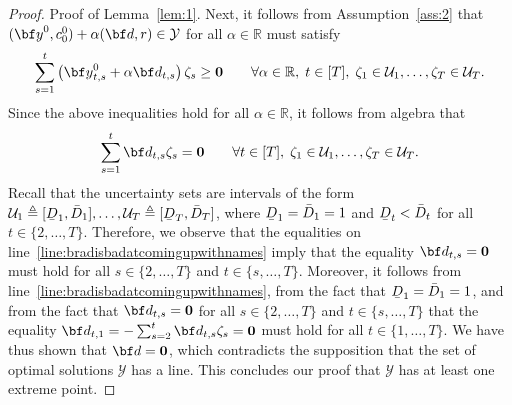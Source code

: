 \documentclass[nonblindrev,mnsc]{informs3} %
\newcommand{\bd}{{\bf d}}
\newcommand{\by}{{\bf y}}
\def\Real{\mathbb{R}}
\let\R\Real
\newcommand{\bzero}{{\boldsymbol{0}}}
\newcommand{\ubar}[1]{\text{\b{$#1$}}}
\begin{document}
\begin{APPENDICES}
\begin{proof}{Proof of Lemma~\ref{lem:1}.}
Next, it follows from Assumption~\ref{ass:2} that $(\by^0,c_0^0)+\alpha (\bd,r) \in \mathcal{Y}$ for all $\alpha\in\R$ must satisfy
\begin{align*}
    \sum_{s=1}^t \left( \by^0_{t,s} + \alpha \bd_{t,s}\right) \zeta_s \ge \bzero  \quad \quad \forall \alpha \in \R, \; t \in [T], \; \zeta_1 \in \mathcal{U}_1,\ldots,\zeta_T \in \mathcal{U}_T. 
\end{align*}
Since the above inequalities hold for all $\alpha \in \R$, it follows from algebra that
\begin{align}
        \sum_{s=1}^t  \bd_{t,s} \zeta_s = \bzero  \quad \quad \forall t \in [T], \; \zeta_1 \in \mathcal{U}_1,\ldots,\zeta_T \in \mathcal{U}_T.  \label{line:bradisbadatcomingupwithnames}
\end{align}
Recall that the uncertainty sets are intervals of the form $\mathcal{U}_1 \triangleq [\ubar{D}_1,\bar{D}_1],\ldots,\mathcal{U}_{T} \triangleq [\ubar{D}_{T}, \bar{D}_{T}]$, where $\ubar{D}_1 = \bar{D}_1 = 1$ and $\ubar{D}_t < \bar{D}_t$ for all $t \in \{2,\ldots,T\}$. Therefore, we observe  that the equalities on line~\eqref{line:bradisbadatcomingupwithnames} imply that the equality $\bd_{t,s} = \bzero$ must hold for all $s \in \{2,\ldots,T\}$ and $t \in \{s,\ldots,T\}$. Moreover, it follows from line~\eqref{line:bradisbadatcomingupwithnames}, from  the fact that $\ubar{D}_1 = \bar{D}_1 = 1$, and from the fact that $\bd_{t,s} = \bzero$ for all $s \in \{2,\ldots,T\}$ and $t \in \{s,\ldots,T\}$ that the equality $\bd_{t,1}=- \sum_{s=2}^t \bd_{t,s} \zeta_s = \bzero$ must hold for all $t \in \{1,\ldots,T\}$. We have thus shown that $\bd = \bzero$, which contradicts the supposition that the set of optimal solutions $\mathcal{Y}$ has a line. This concludes our proof that $\mathcal{Y}$ has at least one extreme point. \halmos
\end{proof} 


\end{APPENDICES}
\end{document}
